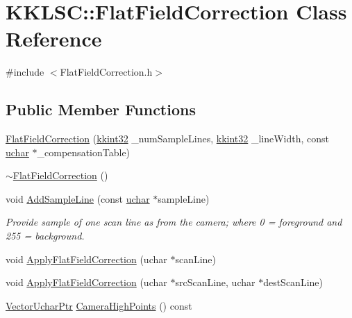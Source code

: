 \hypertarget{class_k_k_l_s_c_1_1_flat_field_correction}{}\section{K\+K\+L\+SC\+:\+:Flat\+Field\+Correction Class Reference}
\label{class_k_k_l_s_c_1_1_flat_field_correction}


{\ttfamily \#include $<$Flat\+Field\+Correction.\+h$>$}

\subsection*{Public Member Functions}
\begin{DoxyCompactItemize}
\item 
\hyperlink{class_k_k_l_s_c_1_1_flat_field_correction_a53cabf40b8cc0a3ba730f8b75fd3d933}{Flat\+Field\+Correction} (\hyperlink{namespace_k_k_b_a8fa4952cc84fda1de4bec1fbdd8d5b1b}{kkint32} \+\_\+num\+Sample\+Lines, \hyperlink{namespace_k_k_b_a8fa4952cc84fda1de4bec1fbdd8d5b1b}{kkint32} \+\_\+line\+Width, const \hyperlink{namespace_k_k_b_ace9969169bf514f9ee6185186949cdf7}{uchar} $\ast$\+\_\+compensation\+Table)
\item 
\hyperlink{class_k_k_l_s_c_1_1_flat_field_correction_ad053309f4f84e6d8ca3a4f3573035579}{$\sim$\+Flat\+Field\+Correction} ()
\item 
void \hyperlink{class_k_k_l_s_c_1_1_flat_field_correction_a83f0de40aee9d61440f8f1fcacae64e6}{Add\+Sample\+Line} (const \hyperlink{namespace_k_k_b_ace9969169bf514f9ee6185186949cdf7}{uchar} $\ast$sample\+Line)
\begin{DoxyCompactList}\small\item\em Provide sample of one scan line as from the camera; where 0 = foreground and 255 = background. \end{DoxyCompactList}\item 
void \hyperlink{class_k_k_l_s_c_1_1_flat_field_correction_ae88aed142a25e321e1e15e48ba738551}{Apply\+Flat\+Field\+Correction} (uchar $\ast$scan\+Line)
\item 
void \hyperlink{class_k_k_l_s_c_1_1_flat_field_correction_a0aeb1e908c99d48606eee99d9568b3b8}{Apply\+Flat\+Field\+Correction} (uchar $\ast$src\+Scan\+Line, uchar $\ast$dest\+Scan\+Line)
\item 
\hyperlink{namespace_k_k_b_ac43cb621a63d628438a729543638a404}{Vector\+Uchar\+Ptr} \hyperlink{class_k_k_l_s_c_1_1_flat_field_correction_ad799855373414fdca9fffd966c12a7ca}{Camera\+High\+Points} () const 

\end{DoxyCompactItemize}
